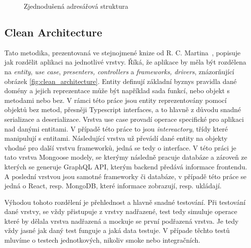 \begin{figure}
    \caption{Zjednodušená adresářová struktura}
    \label{fig:modules}
\end{figure}

\subsection{Clean Architecture}
\label{ss:clean_architecture}
Tato metodika, prezentovaná ve stejnojmené knize od R. C. Martina~\cite{martin_2018_clean}, popisuje jak rozdělit aplikaci na jednotlivé vrstvy. Říká, že aplikace by měla být rozdělena na \emph{entity}, \emph{use case}, \emph{presenters, controllers} a \emph{frameworks, drivers}, znázorňující obrázek \ref{fig:clean_architecture}.
Entity definují základní byznys pravidla dané domény a jejich reprezentace může být například sada funkcí, nebo objekt s metodami nebo bez. V rámci této práce jsou entity reprezentovány pomocí objektů bez metod, přesněji Typescript interfaces, a to hlavně z důvodu snadné serializace a deserializace.
Vrstva use case provadí operace specifické pro aplikaci nad danými entitami. V případě této práce to jsou \emph{intereactory}, třídy které manipulují s entitami.
Následující vrstva už převádí dané entity na objekty vhodné pro další vrstvu frameworků, jedná se tedy o interface. V této práci je tato vrstva Mongoose modely, se kterýmy následně pracuje databáze a zároveň ze kterých se generuje GraphQL API, kterým backend předává informace frontendu. A poslední vrstvou jsou samotné frameworky či databáze, v případě této práce se jedná o React, resp. MongoDB, které informace zobrazují, resp. ukládají.

Výhodou tohoto rozdělení je přehlednost a hlavně snadné testování. Při testování dané vrstvy, se vždy přistupuje z vrstvy nadřazené, test tedy simuluje operace které by dělala vrstva nadřazená a mockuje se první podřazená vrstva. Je tedy vždy jasné jak daný test funguje a jaká data testuje. V případe těchto testů mluvíme o testech jednotkových, nikoliv smoke nebo integračních.

